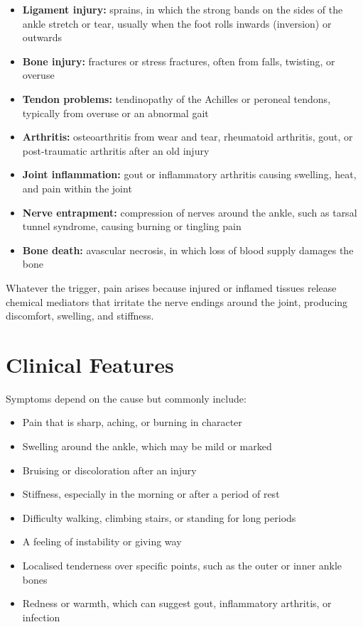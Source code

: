 \begin{itemize}
    \item \textbf{Ligament injury:} sprains, in which the strong bands on the sides of the ankle stretch or tear, usually when the foot rolls inwards (inversion) or outwards
    \item \textbf{Bone injury:} fractures or stress fractures, often from falls, twisting, or overuse
    \item \textbf{Tendon problems:} tendinopathy of the Achilles or peroneal tendons, typically from overuse or an abnormal gait
    \item \textbf{Arthritis:} osteoarthritis from wear and tear, rheumatoid arthritis, gout, or post-traumatic arthritis after an old injury
    \item \textbf{Joint inflammation:} gout or inflammatory arthritis causing swelling, heat, and pain within the joint
    \item \textbf{Nerve entrapment:} compression of nerves around the ankle, such as tarsal tunnel syndrome, causing burning or tingling pain
    \item \textbf{Bone death:} avascular necrosis, in which loss of blood supply damages the bone
\end{itemize}

Whatever the trigger, pain arises because injured or inflamed tissues release chemical mediators that irritate the nerve endings around the joint, producing discomfort, swelling, and stiffness.

\section*{Clinical Features}
Symptoms depend on the cause but commonly include:

\begin{itemize}
    \item Pain that is sharp, aching, or burning in character
    \item Swelling around the ankle, which may be mild or marked
    \item Bruising or discoloration after an injury
    \item Stiffness, especially in the morning or after a period of rest
    \item Difficulty walking, climbing stairs, or standing for long periods
    \item A feeling of instability or giving way
    \item Localised tenderness over specific points, such as the outer or inner ankle bones
    \item Redness or warmth, which can suggest gout, inflammatory arthritis, or infection
\end{itemize}

